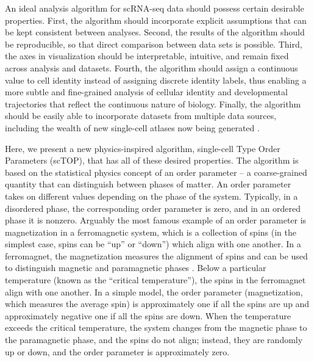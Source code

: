 \documentclass[vruler,JEB]{COB}%
\begin{document}
An ideal analysis algorithm for scRNA-seq data should possess certain desirable properties. First, the algorithm should incorporate explicit assumptions that can be kept consistent between analyses. Second, the results of the algorithm should be reproducible, so that direct comparison between data sets is possible. Third, the axes in visualization should be interpretable, intuitive, and remain fixed across analysis and datasets. Fourth, the algorithm should assign a continuous value to cell identity instead of assigning discrete identity labels, thus enabling a more subtle and fine-grained analysis of cellular identity and developmental trajectories that reflect the continuous nature of biology. Finally, the algorithm should be easily able to incorporate datasets from multiple data sources, including the wealth of new single-cell atlases now being generated \citep{quake2022decade}.

Here, we present a new physics-inspired algorithm, single-cell Type Order Parameters (scTOP), that has all of these desired properties. The algorithm is based on the statistical physics concept of an order parameter -- a coarse-grained quantity that can distinguish between phases of matter. An order parameter takes on different values depending on the phase of the system. Typically, in a disordered phase, the corresponding order parameter is zero, and in an ordered phase it is nonzero. Arguably the most famous example of an order parameter is magnetization in a ferromagnetic system, which is a collection of spins (in the simplest case, spins can be ``up'' or ``down'') which align with one another. In a ferromagnet, the magnetization measures the alignment of spins and can be used to distinguish magnetic and paramagnetic phases \citep{landau2013statistical,sethna2021statistical}. Below a particular temperature (known as the ``critical temperature''), the spins in the ferromagnet align with one another. In a simple model, the order parameter (magnetization, which measures the average spin) is approximately one if all the spins are up and approximately negative one if all the spins are down. When the temperature exceeds the critical temperature, the system changes from the magnetic phase to the paramagnetic phase, and the spins do not align; instead, they are randomly up or down, and the order parameter is approximately zero.
\end{document}
